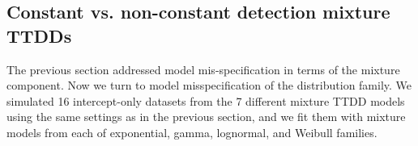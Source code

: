 \documentclass[12pt]{article}
\begin{document}








\subsection{Constant vs. non-constant detection mixture TTDDs}\label{sec:family}

The previous section addressed model mis-specification in terms of the mixture component. 
Now we turn to model misspecification of the distribution family. 
We simulated 16 intercept-only datasets from the 7 different mixture TTDD models using the same settings as in the previous section, and we fit them with mixture models from each of exponential, gamma, lognormal, and Weibull families.
\end{document}

